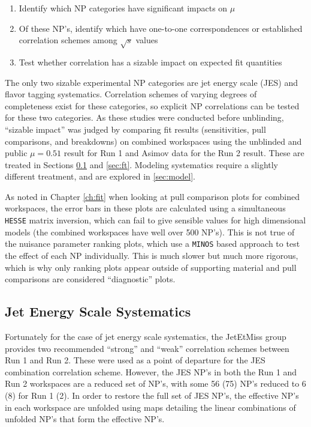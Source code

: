 \begin{enumerate}
\item Identify which NP categories have significant impacts on $\mu$
\item Of these NP's, identify which have one-to-one correspondences or established correlation schemes among $\sqrt{s}$ values
\item Test whether correlation has a sizable impact on expected fit quantities
\end{enumerate}

The only two sizable experimental NP categories are jet energy scale (JES) and flavor tagging systematics.  Correlation schemes of varying degrees of completeness exist for these categories, so explicit NP correlations can be tested for these two categories.  As these studies were conducted before unblinding, ``sizable impact'' was judged by comparing fit results (sensitivities, pull comparisons, and breakdowns) on combined workspaces using the unblinded and public $\mu=0.51$ result for Run 1 and Asimov data for the Run 2 result.  These are treated in Sections \ref{sec:jes} and \ref{sec:ft}.  Modeling systematics require a slightly different treatment, and are explored in \ref{sec:model}.

As noted in Chapter \ref{ch:fit} when looking at pull comparison plots for combined workspaces, the error bars in these plots are calculated using a simultaneous \texttt{HESSE} matrix inversion, which can fail to give sensible values for high dimensional models (the combined workspaces have well over 500 NP's).  This is not true of the nuisance parameter ranking plots, which use a \texttt{MINOS} based approach to test the effect of each NP individually.  This is much slower but much more rigorous, which is why only ranking plots appear outside of supporting material and pull comparisons are considered ``diagnostic'' plots.

\subsection{Jet Energy Scale Systematics}
\label{sec:jes}
Fortunately for the case of jet energy scale systematics, the JetEtMiss group provides two recommended ``strong'' and ``weak'' correlation schemes between Run 1 and Run 2.  These were used as a point of departure for the JES combination correlation scheme.  However, the JES NP's in both the Run 1 and Run 2 workspaces are a reduced set of NP's, with some 56 (75) NP's reduced to 6 (8) for Run 1 (2).  In order to restore the full set of JES NP's, the effective NP's in each workspace are unfolded using maps detailing the linear combinations of unfolded NP's that form the effective NP's.  


